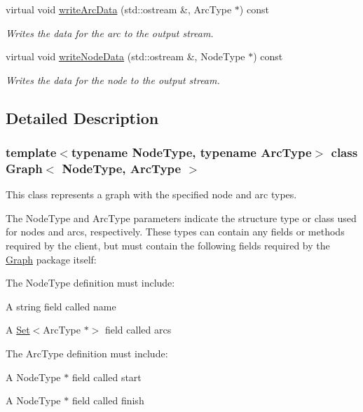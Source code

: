 \begin{DoxyCompactItemize}
virtual void \mbox{\hyperlink{classGraph_ac9ab61a83ff4792f63e9e110b534cdfd}{write\+Arc\+Data}} (std\+::ostream \&, Arc\+Type $\ast$) const
\begin{DoxyCompactList}\small\item\em Writes the data for the arc to the output stream. \end{DoxyCompactList}\item 
virtual void \mbox{\hyperlink{classGraph_ac0db5231476c8cb10655d58ebc108b78}{write\+Node\+Data}} (std\+::ostream \&, Node\+Type $\ast$) const
\begin{DoxyCompactList}\small\item\em Writes the data for the node to the output stream. \end{DoxyCompactList}\end{DoxyCompactItemize}


\subsection{Detailed Description}
\subsubsection*{template$<$typename Node\+Type, typename Arc\+Type$>$\newline
class Graph$<$ Node\+Type, Arc\+Type $>$}

This class represents a graph with the specified node and arc types. 

The {\ttfamily Node\+Type} and {\ttfamily Arc\+Type} parameters indicate the structure type or class used for nodes and arcs, respectively. These types can contain any fields or methods required by the client, but must contain the following fields required by the {\ttfamily \mbox{\hyperlink{classGraph}{Graph}}} package itself\+:

The {\ttfamily Node\+Type} definition must include\+: 
\begin{DoxyItemize}
\item A {\ttfamily string} field called {\ttfamily name} 
\item A {\ttfamily \mbox{\hyperlink{classSet}{Set}}$<$Arc\+Type $\ast$$>$} field called {\ttfamily arcs} 
\end{DoxyItemize}

The {\ttfamily Arc\+Type} definition must include\+: 
\begin{DoxyItemize}
\item A {\ttfamily Node\+Type $\ast$} field called {\ttfamily start} 
\item A {\ttfamily Node\+Type $\ast$} field called {\ttfamily finish} 
\end{DoxyItemize}


